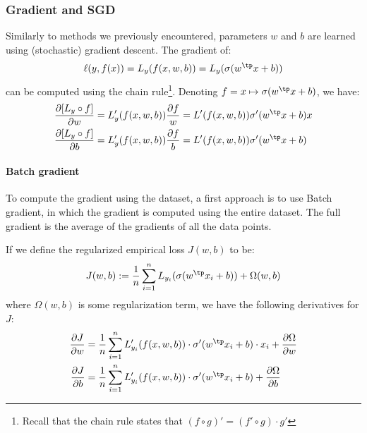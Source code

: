 \documentclass[toc, titlepaged]{../cs-classes/cs-classes}
\begin{document}
\subsubsection{Gradient and SGD}
Similarly to methods we previously encountered, parameters $w$ and $b$ are learned using (stochastic) gradient descent. The gradient of:
\begin{equation*}
    \ell(y, f(x)) = L_y(f(x, w, b)) = L_y(\sigma(w^\tp x + b))
\end{equation*}
can be computed using the chain rule\footnote{Recall that the chain rule states that $(f\circ g)' = (f'\circ g)\cdot g'$}. Denoting $f=x\mapsto\sigma(w^\tp x+b)$, we have:
\begin{equation*}
    \begin{aligned}
        \frac{\partial[L_y\circ f]}{\partial w} &= L_y'(f(x, w, b))\frac{\partial f}{w} = L'(f(x, w, b)) \sigma'(w^\tp x+b)x\\
        \frac{\partial[L_y\circ f]}{\partial b} &= L_y'(f(x, w, b))\frac{\partial f}{b} = L'(f(x, w, b)) \sigma'(w^\tp x+b)
    \end{aligned}
\end{equation*}

\paragraph*{Batch gradient}
To compute the gradient using the dataset, a first approach is to use Batch gradient, in which the gradient is computed using the entire dataset. The full gradient is the average of the gradients of all the data points.

If we define the regularized empirical loss $J(w, b)$ to be:
\begin{equation}
    J(w, b) := \frac{1}{n}\sum_{i=1}^n L_{y_i}(\sigma(w^\tp x_i + b)) + \Omega(w, b)
\end{equation}
where $\Omega(w, b)$ is some regularization term, we have the following derivatives for $J$:
\begin{equation*}
    \begin{aligned}
        \frac{\partial J}{\partial w} &= \frac{1}{n}\sum_{i=1}^n L_{y_i}'(f(x, w, b)) \cdot \sigma'(w^\tp x_i+b)\cdot x_i + \frac{\partial\Omega}{\partial w}\\
        \frac{\partial J}{\partial b} &= \frac{1}{n}\sum_{i=1}^n L_{y_i}'(f(x, w, b)) \cdot \sigma'(w^\tp x_i+b) + \frac{\partial\Omega}{\partial b}
    \end{aligned}
\end{equation*}
\end{document}
